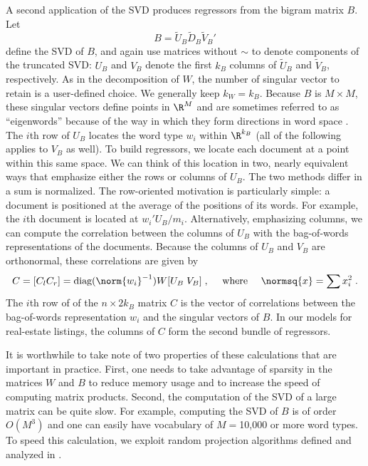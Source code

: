 \documentclass[12pt]{article}
\begin{document}
 
 A second application of the SVD produces regressors from the bigram matrix $B$.
  Let
 \begin{equation}
       B = \tilde{U}_B \tilde{D}_B \tilde{V}_B'
 \label{eq:svdB}
 \end{equation}
 define the SVD of $B$, and again use matrices without $\sim$ to denote components of the truncated SVD:  $U_B$ and $V_B$ denote the first $k_B$ columns of $\tilde{U}_B$ and $\tilde{V}_B$, respectively.  As in the
 decomposition of $W$, the number of singular vector to retain is a user-defined choice.  We generally keep $k_W = k_B$.  Because $B$ is $M
 \times M$, these singular vectors define points in $\R^M$ and are sometimes referred to as ``eigenwords'' because of the way in which they form directions in word space .  The $i$th row of $U_B$  locates the word type $w_i$ within $\R^{k_B}$  (all of the following applies  to $V_B$ as well).  To build regressors, we locate each document at a point within this same space.  We can think of this location in two, nearly equivalent ways that emphasize either the rows or columns of $U_B$.  The two methods differ in a sum is normalized.  The row-oriented motivation is particularly simple: a document is positioned at the average of the positions of its words.  For example, the $i$th document is located at $w_i'U_B/m_i$.  Alternatively, emphasizing columns, we can compute the correlation between the columns of $U_B$ with the bag-of-words representations of the documents.  Because the columns of $U_B$  and $V_B$ are orthonormal, these correlations are given by
 \begin{equation}
     C = [C_l C_r] 
         = \mbox{diag}(\norm{w_i}^{-1})W[U_B \; V_B]   \;, 
            \quad \mbox{ where } \quad  \normsq{x} = \sum x_i^2  \;.
 \label{eq:C}
 \end{equation}
 The $i$th row of of the $n \times 2k_B$ matrix $C$ is the vector of correlations between the bag-of-words representation $w_i$ and the singular vectors of $B$.  In our models for real-estate listings, the columns of $C$ form the second bundle of regressors.


 It is worthwhile to take note of two properties of these calculations that are
 important in practice.  First, one needs to take advantage of sparsity in the
 matrices $W$ and $B$ to reduce memory usage and to increase the speed of
 computing matrix products.  Second, the computation of the SVD of a large
 matrix can be quite slow.  For example, computing the SVD of $B$ is of order
 $O(M^3)$ and one can easily have vocabulary of $M=$10,000 or more word types.
  To speed this calculation, we exploit random projection algorithms defined and
 analyzed in \citet{tropp10}.
\end{document}
